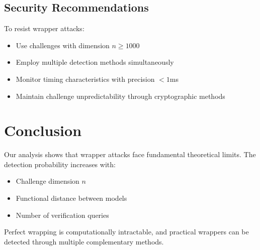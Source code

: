 \documentclass[11pt]{article}
\theoremstyle{plain}
\begin{document}
\subsection{Security Recommendations}
To resist wrapper attacks:
\begin{itemize}
    \item Use challenges with dimension $n \geq 1000$
    \item Employ multiple detection methods simultaneously
    \item Monitor timing characteristics with precision $< 1$ms
    \item Maintain challenge unpredictability through cryptographic methods
\end{itemize}

\section{Conclusion}

Our analysis shows that wrapper attacks face fundamental theoretical limits. 
The detection probability increases with:
\begin{itemize}
    \item Challenge dimension $n$
    \item Functional distance between models
    \item Number of verification queries
\end{itemize}

Perfect wrapping is computationally intractable, and practical wrappers 
can be detected through multiple complementary methods.
\end{document}
